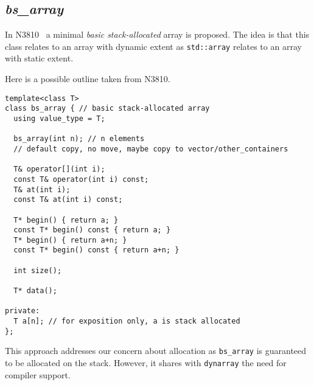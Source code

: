 \subsection{\emph{bs\_array}}

In N3810~\cite{n3810} a minimal \emph{basic stack-allocated} array is proposed.
The idea is that this class relates to an array with dynamic extent as
\verb+std::array+ relates to an array with static extent.

Here is a possible outline taken from N3810.

\begin{lstlisting}
template<class T>
class bs_array { // basic stack-allocated array
  using value_type = T;

  bs_array(int n); // n elements
  // default copy, no move, maybe copy to vector/other_containers

  T& operator[](int i); 
  const T& operator(int i) const; 
  T& at(int i); 
  const T& at(int i) const; 

  T* begin() { return a; } 
  const T* begin() const { return a; }
  T* begin() { return a+n; }
  const T* begin() const { return a+n; }

  int size();

  T* data();

private:
  T a[n]; // for exposition only, a is stack allocated
};
\end{lstlisting}

This approach addresses our concern about allocation as \verb+bs_array+ is
guaranteed to be allocated on the stack. However, it shares with \verb+dynarray+
the need for compiler support.
